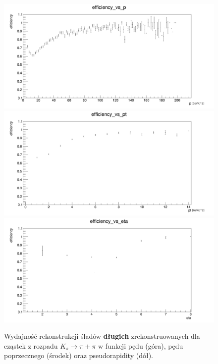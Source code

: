 \begin{figure}[H]
\centering
\includegraphics[scale=0.25]{rozdzial6/KsLL_p.png} \\
\includegraphics[scale=0.25]{rozdzial6/KsLL_pt.png} \\
\includegraphics[scale=0.25]{rozdzial6/KsLL_eta.png} \\ 
\caption{Wydajność rekonstrukcji śladów \textbf{długich} zrekonstruowanych dla cząstek z rozpadu $K_s \rightarrow \pi + \pi $  w funkcji pędu (góra), pędu poprzecznego (środek) oraz pseudorapidity (dół).}
\label{KsLL}
\end{figure}

